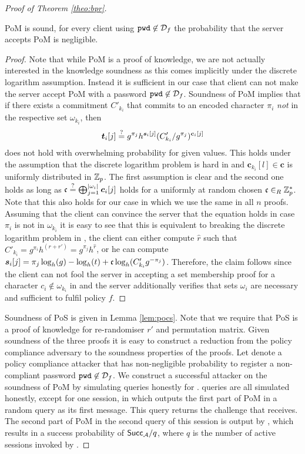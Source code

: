 \begin{proof}[Proof of Theorem \ref{theo:bpr}]
\begin{claim}
  \ac{PoM} is sound, \ie for every client \Client using $\mathtt{pwd}\not\in\mathcal{D}_f$ the probability that the server accepts \ac{PoM} is negligible.
\end{claim}

\begin{proof}
Note that while \ac{PoM} is a proof of knowledge, we are not actually interested in the knowledge soundness as this comes implicitly under the discrete logarithm assumption.
Instead it is sufficient in our case that client \Client can not make the server accept \ac{PoM} with a password $\mathtt{pwd}\not\in\mathcal{D}_f$.
Soundness of \ac{PoM} implies that if there exists a commitment $C'_{k_i}$ that commits to an encoded character $\pi_i$ \emph{not} in the respective set $\omega_{k_i}$, then
\[ \bm t_i[j] \stackrel{?}{=} g^{\pi_j}h^{\bm s_i[j]}(C'_{k_i}/g^{\pi_j})^{\bm c_i[j]} \]
does not hold with overwhelming probability for given values.
This holds under the assumption that the discrete logarithm problem is hard in \GG and $\bm c_{k_i}[l] \in \bm c$ is uniformly distributed in $\mathbb{Z}_p$.
The first assumption is clear and the second one holds as long as $\mathfrak{c}\stackrel{?}{=}\bigoplus_{j=1}^{|\omega_i|}\bm c_i[j]$ holds for a uniformly at random chosen $\mathfrak{c}\in_R\mathbb{Z}^\ast_p$.
Note that this also holds for our case in which we use the same \Ch in all $n$ proofs.
Assuming that the client can convince the server that the equation holds in case $\pi_i$ is not in $\omega_{k_i}$ it is easy to see that this is equivalent to breaking the discrete logarithm problem in \GG, \ie the client can either compute $\hat{r}$ such that $C'_{k_i}=g^{\pi_i}h^{(r+r')}=g^{\pi_j}h^{\hat{r}}$, or he can compute $\bm s_i[j]=\pi_j \log_h(g) - \log_h(t) + \mathfrak{c}\log_h(C'_{k_i}g^{-\pi_j})$.
Therefore, the claim follows since the client can not fool the server in accepting a set membership proof for a character $c_i\not\in\omega_{k_i}$ in \pwd and the server additionally verifies that sets $\omega_i$ are necessary and sufficient to fulfil policy $f$.

\end{proof}

\noindent
Soundness of \ac{PoS} is given in Lemma \ref{lem:pocs}.
Note that we require that \ac{PoS} is a proof of knowledge for re-randomiser $r'$ and permutation matrix.
Given soundness of the three proofs it is easy to construct a reduction from the policy compliance adversary to the soundness properties of the proofs.
Let \cA denote a policy compliance attacker that has non-negligible probability to register a non-compliant password  $\mathtt{pwd}\not\in\mathcal{D}_f$.
We construct a successful attacker \cB on the soundness of \ac{PoM} by simulating \Execute queries honestly for \cA.
\Send queries are all simulated honestly, except for one session, in which \cB outputs the first part of \ac{PoM} in a random \Send query as its first message.
This \Send query returns the challenge that \cB receives.
The second part of \ac{PoM} in the second \Send query of this session is output by \cB, which results in a success probability of $\mathsf{Succ}_{\mathcal{A}}/q$, where $q$ is the number of active sessions invoked by \cA.


\end{proof}
